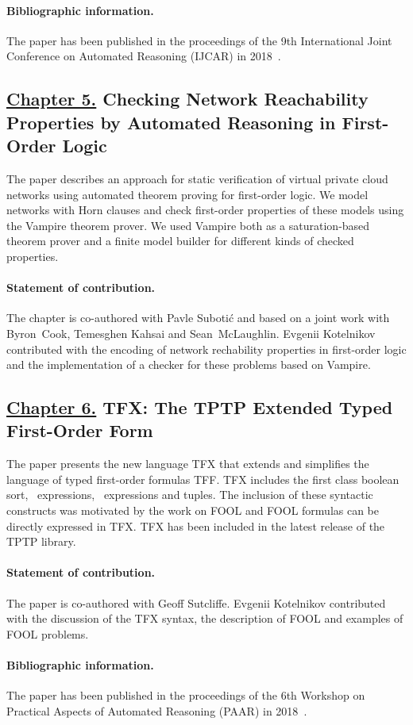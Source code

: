 \paragraph{Bibliographic information.} The paper has been published in the proceedings of the 9th International Joint Conference on Automated Reasoning (IJCAR) in 2018~\cite{KKV18}.

\subsection*{\hyperref[chap:aws]{Chapter 5.} Checking Network Reachability Properties by Automated Reasoning in First-Order Logic}
The paper describes an approach for static verification of virtual private cloud networks using automated theorem proving for first-order logic. We model networks with Horn clauses and check first-order properties of these models using the Vampire theorem prover. We used Vampire both as a saturation-based theorem prover and a finite model builder for different kinds of checked properties.

\paragraph{Statement of contribution.} The chapter is co-authored with Pavle Suboti\'{c} and based on a joint work with Byron~Cook, Temesghen Kahsai and Sean~McLaughlin. Evgenii Kotelnikov contributed with the encoding of network rechability properties in first-order logic and the implementation of a checker for these problems based on Vampire.

\subsection*{\hyperref[chap:tfx]{Chapter 6.} TFX: The TPTP Extended Typed First-Order Form}
The paper presents the new language TFX that extends and simplifies the language of typed first-order formulas TFF. TFX includes the first class boolean sort, \ITE\ expressions, \LETIN\ expressions and tuples. The inclusion of these syntactic constructs was motivated by the work on FOOL and FOOL formulas can be directly expressed in TFX. TFX has been included in the latest release of the TPTP library.

\paragraph{Statement of contribution.} The paper is co-authored with Geoff Sutcliffe. Evgenii Kotelnikov contributed with the discussion of the TFX syntax, the description of FOOL and examples of FOOL problems.

\paragraph{Bibliographic information.} The paper has been published in the proceedings of the 6th Workshop on Practical Aspects of Automated Reasoning (PAAR) in 2018~\cite{SutcliffeK18}.

